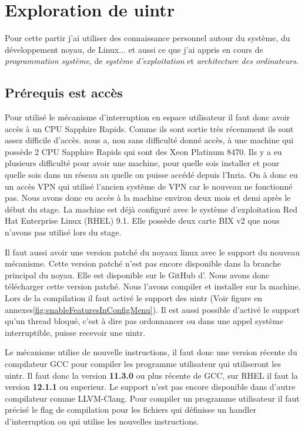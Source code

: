\section{Exploration de uintr}
\label{sec:exploreUintr}

Pour cette partir j'ai utiliser des connaissance personnel autour du système, du développement noyau, de Linux... et aussi ce que j'ai appris en cours de \emph{programmation système}, de \emph{système d'exploitation} et \emph{architecture des ordinateurs}.

\subsection{Prérequis est accès}
\label{requirements}

Pour utilisé le mécanisme d'interruption en espace utilisateur il faut donc avoir accès à un CPU \intel{} Sapphire Rapids.
Comme ils sont sortie très récemment ils sont assez difficile d'accès.
\atos{} nous a, non sans difficulté donné accès, à une machine qui possède 2 CPU \intel{} Sapphire Rapids qui sont des \intel{} Xeon\textsuperscript{\tiny{\textregistered}} Platinum 8470.
Ils y a eu plusieurs difficulté pour avoir une machine, pour quelle sois installer et pour quelle sois dans un réseau au quelle on puisse accédé depuis l'Inria.
On à donc eu un accès VPN qui utilisé l'ancien système de VPN car le nouveau ne fonctionné pas.
Nous avons donc eu accès à la machine environ deux mois et demi après le début du stage.
La machine est déjà configuré avec le système d'exploitation Red Hat Enterprise Linux (RHEL) 9.1.
Elle possède deux carte BIX v2 que nous n'avons pas utilisé lors du stage.

Il faut aussi avoir une version patché du noyaux linux avec le support du nouveau mécanisme.
Cette version patché n'est pas encore disponible dans la branche principal du noyau.
Elle est disponible sur le GitHub d'\intel{}. Nous avons donc télécharger cette version patché.
Nous l'avons compiler et installer sur la machine.
Lors de la compilation il faut activé le support des uintr (Voir figure en annexes\ref{fig:enableFeaturesInConfigMenu}).
Il est aussi possible d'activé le support qu'un thread bloqué, c'est à dire pas ordonnancer ou dans une appel système interruptible, puisse recevoir une uintr.

Le mécanisme utilise de nouvelle instructions, il faut donc une version récente du compilateur GCC pour compiler les programme utilisateur qui utiliseront les uintr.
Il faut donc la version \textbf{11.3.0} ou plus récente de GCC, sur RHEL il faut la version \textbf{12.1.1} ou superieur.
Le support n'est pas encore disponible dans d'autre compilateur comme LLVM-Clang.
Pour compiler un programme utilisateur il faut précisé le flag de compilation  pour les fichiers qui définisse un handler d'interruption ou qui utilise les nouvelles instructions.

